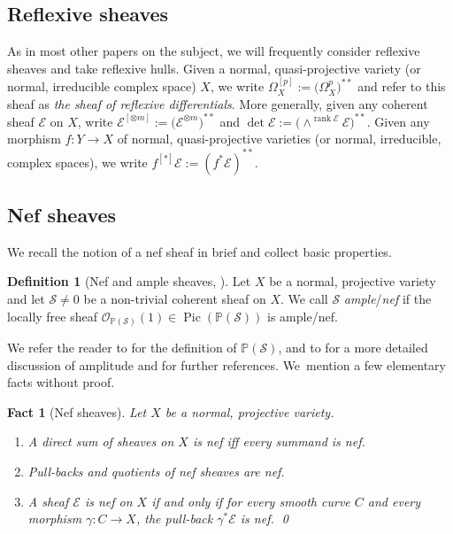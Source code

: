 \documentclass[JEP,XML,SOM,Unicode,published]{cedram}
\let\scr\mathscr
\newenvironment{enumeraten}
{\begin{enumerate}\setcounter{enumi}{\value{equation}}\itemindent0pt}
{\setcounter{equation}{\value{enumi}}\end{enumerate}}
\theoremstyle{plain}
\newtheorem{fact}[thm]{Fact}
\theoremstyle{definition}
\newtheorem{defn}[thm]{Definition}
\numberwithin{equation}{thm}
\numberwithin{enumi}{thm}
\DeclareMathOperator{\Pic}{Pic}
\DeclareMathOperator{\rank}{rank}
\newcommand{\sE}{\scr{E}}
\newcommand{\sO}{\scr{O}}
\newcommand{\sS}{\scr{S}}
\newcommand{\bP}{\mathbb{P}}
\begin{document}
\subsection{Reflexive sheaves}

As in most other papers on the subject, we will frequently consider reflexive
sheaves and take reflexive hulls. Given a normal, quasi-projective variety (or
normal, irreducible complex space) $X$, we write
$\Omega^{[p]}_X := \bigl(\Omega^p_X \bigr)^{**}$ and refer to this sheaf as \emph{the
sheaf of reflexive differentials}. More generally, given any coherent sheaf
$\sE$ on $X$, write $\sE^{[\otimes m]} := \bigl(\sE^{\otimes m} \bigr)^{**}$ and
$\det \sE := \bigl(\wedge^{\rank \sE} \sE \bigr)^{**}$. Given any morphism $f : Y \to X$ of
normal, quasi-projective varieties (or normal, irreducible, complex spaces), we
write $f^{[*]} \sE := (f^* \sE)^{**}$.

\subsection{Nef sheaves}

We recall the notion of a nef sheaf in brief and collect basic properties.

\begin{defn}[Nef and ample sheaves, \cite{MR670921}]\label{def:possheaf}
Let $X$ be a normal, projective variety and let $\sS \not = 0$ be a non-trivial
coherent sheaf on $X$. We call $\sS$ \emph{ample}/\emph{nef} if the locally
free sheaf $\sO_{\bP(\sS)}(1) \in \Pic(\bP(\sS))$ is ample/nef.
\end{defn}

We refer the reader to \cite{GrCa60} for the definition of $\bP(\sS)$, and to
\cite[\S 2 \&\,Th.\,2.9]{MR670921} for a more detailed discussion of
amplitude and for further references. We~mention a few elementary facts without
proof.

\begin{fact}[Nef sheaves]\label{fact:1}
Let $X$ be a normal, projective variety.
\begin{enumeraten}
\item\label{il:f1-1} A direct sum of sheaves on $X$ is nef iff every summand
is nef.
\item\label{il:f1-2} Pull-backs and quotients of nef sheaves are nef.
\item\label{il:f1-3} A sheaf $\sE$ is nef on $X$ if and only if for every smooth
curve $C$ and every morphism $\gamma: C \to X$, the pull-back $\gamma^* \sE$ is nef. \qed
\end{enumeraten}
\end{fact}
\end{document}
